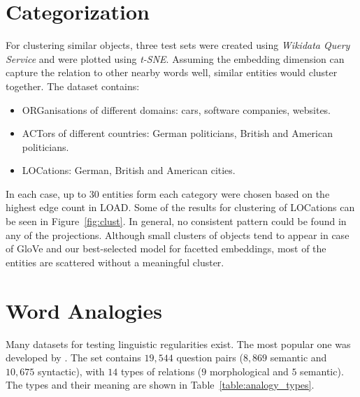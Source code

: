\section{Categorization}\label{sec:categorize}
For clustering similar objects, three test sets were created using \emph{Wikidata Query Service} and were plotted using \emph{t-SNE}. Assuming the embedding dimension can capture the relation to other nearby words well, similar entities would cluster together. The dataset contains:
  \begin{itemize}
    \item ORGanisations of different domains: cars, software companies, websites. 
    \item ACTors of different countries: German politicians, British and American politicians.
    \item LOCations: German, British and American cities.
    \end{itemize}
In each case, up to $30$ entities form each category were chosen based on the highest edge count in LOAD. Some of the results for clustering of LOCations can be seen in Figure~\ref{fig:clust}. In general, no consistent pattern could be found in any of the projections. Although small clusters of objects tend to appear in case of GloVe and our best-selected model for facetted embeddings, most of the entities are scattered without a meaningful cluster. 
\section{Word Analogies}\label{sec:alanlogies}
Many datasets for testing linguistic regularities exist. The most popular one was developed by \cite{DBLP:journals/corr/abs-1301-3781}. The set contains $19,544$ question pairs ($8,869$ semantic and $10,675$ syntactic), with $14$ types of relations ($9$ morphological and $5$ semantic). The types and their meaning are shown in Table~\ref{table:analogy_types}.



